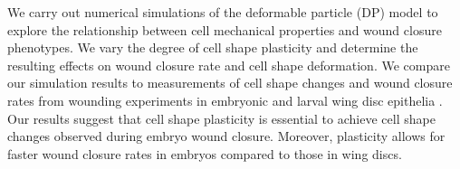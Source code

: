 \documentclass[%
 reprint,
superscriptaddress,
amsmath,amssymb,
prl,
floatfix,
]{revtex4-2}
\begin{document}
We carry out numerical simulations of the deformable particle (DP) model to explore the relationship between cell mechanical properties and wound closure phenotypes. We vary the degree of cell shape plasticity and determine the resulting effects on wound closure rate and cell shape deformation. We compare our simulation results to measurements of cell shape changes and wound closure rates from wounding experiments in embryonic and larval wing disc epithelia \cite{tetley2019tissue}. Our results suggest that cell shape plasticity is essential to achieve cell shape changes observed during embryo wound closure. Moreover, plasticity allows for faster wound closure rates in embryos compared to those in wing discs. 
\end{document}
